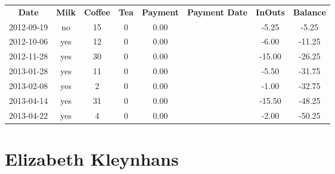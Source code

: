 \begin{center}
\begin{tabular}{cccccccc}
\textbf{Date} & \textbf{Milk} & \textbf{Coffee} & \textbf{Tea} & \textbf{Payment} & \textbf{Payment Date} & \textbf{InOuts} & \textbf{Balance} \\
2012-09-19 & no & 15 & 0 & 0.00 &  &  -5.25 &  -5.25\\ 
2012-10-06 & yes & 12 & 0 & 0.00 &  &  -6.00 & -11.25\\ 
2012-11-28 & yes & 30 & 0 & 0.00 &  & -15.00 & -26.25\\ 
2013-01-28 & yes & 11 & 0 & 0.00 &  &  -5.50 & -31.75\\ 
2013-02-08 & yes &  2 & 0 & 0.00 &  &  -1.00 & -32.75\\ 
2013-04-14 & yes & 31 & 0 & 0.00 &  & -15.50 & -48.25\\ 
2013-04-22 & yes &  4 & 0 & 0.00 &  &  -2.00 & -50.25
\end{tabular}
\end{center}

\section{Elizabeth Kleynhans}

